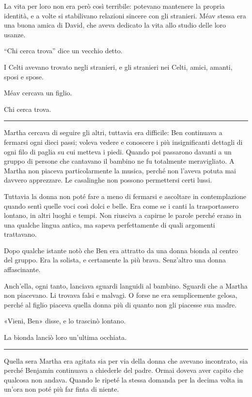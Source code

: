 La vita per loro non era però così terribile: potevano mantenere la propria identità, e a volte si
stabilivano relazioni sincere con gli stranieri. Méav stessa era una buona amica di David, che aveva
dedicato la vita allo studio delle loro usanze.

``Chi cerca trova'' dice un vecchio detto.

I Celti avevano trovato negli stranieri, e gli stranieri nei Celti, amici, amanti, sposi e spose.

Méav cercava un figlio.

Chi cerca trova.

\plainbreak{1}

Martha cercava di seguire gli altri, tuttavia era difficile: Ben continuava a fermarsi ogni dieci
passi; voleva vedere e conoscere i più insignificanti dettagli di ogni filo di paglia su cui metteva
i piedi. Quando poi passarono davanti a un gruppo di persone che cantavano il bambino ne fu
totalmente meravigliato. A Martha non piaceva particolarmente la musica, perché non l'aveva potuta
mai davvero apprezzare. Le casalinghe non possono permettersi certi lussi.

Tuttavia la donna non poté fare a meno di fermarsi e ascoltare in contemplazione quando sentì quelle
voci così dolci e belle. Era come se i canti la trasportassero lontano, in altri luoghi e tempi. Non
riusciva a capirne le parole perché erano in una qualche lingua antica, ma sapeva perfettamente di
quali argomenti trattavano.

Dopo qualche istante notò che Ben era attratto da una donna bionda al centro del gruppo. Era la
solista, e certamente la più brava. Senz'altro una donna affascinante.

Anch'ella, ogni tanto, lanciava sguardi languidi al bambino. Sguardi che a Martha non piacevano. Li
trovava falsi e malvagi. O forse ne era semplicemente gelosa, perché al figlio piaceva quella donna
più di quanto non gli piacesse sua madre.

«Vieni, Ben» disse, e lo trascinò lontano.

La bionda lanciò loro un'ultima occhiata.

\plainbreak{1}

Quella sera Martha era agitata sia per via della donna che avevano incontrato, sia perché Benjamin
continuava a chiederle del padre. Ormai doveva aver capito che qualcosa non andava. Quando le ripeté
la stessa domanda per la decima volta in un'ora non poté più far finta di niente.


